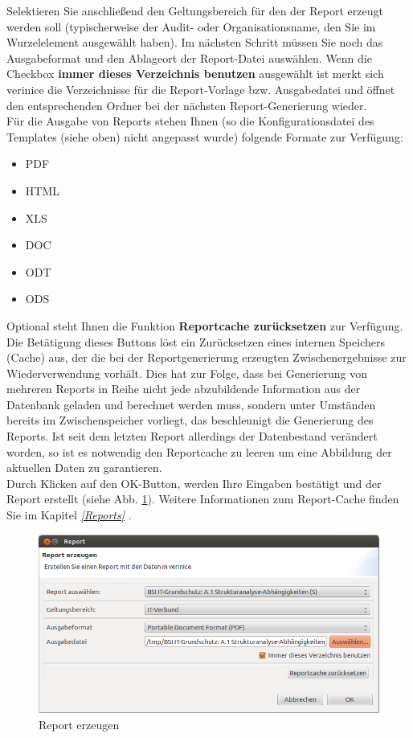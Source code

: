 \documentclass[a4paper,10pt]{book}
\begin{document}
Selektieren Sie anschließend den Geltungsbereich für den der Report erzeugt werden soll
(typischerweise der Audit- oder Organisationsname, den Sie im Wurzelelement ausgewählt haben). Im nächsten Schritt müssen Sie noch das Ausgabeformat
und den Ablageort der Report-Datei auswählen. Wenn die Checkbox \textbf{immer dieses Verzeichnis benutzen} ausgewählt ist merkt sich verinice die Verzeichnisse für die Report-Vorlage bzw. Ausgabedatei und öffnet den entsprechenden Ordner bei der nächsten Report-Generierung wieder.
\newline\\
Für die Ausgabe von Reports stehen Ihnen (so die Konfigurationsdatei des Templates (siehe oben) nicht angepasst wurde) folgende Formate zur Verfügung:
\begin{itemize}
 \item \textsc{PDF}
 \item \textsc{HTML}
 \item \textsc{XLS}
 \item \textsc{DOC}
 \item \textsc{ODT}
 \item \textsc{ODS}
\end{itemize}
Optional steht Ihnen die Funktion \textbf{Reportcache zurücksetzen} zur
Verfügung. Die Betätigung dieses Buttons löst ein Zurücksetzen eines
internen Speichers (Cache) aus,
der die bei der Reportgenerierung erzeugten Zwischenergebnisse zur
Wiederverwendung vorhält. Dies hat zur Folge, dass bei Generierung von
mehreren Reports in Reihe nicht jede abzubildende Information aus der Datenbank geladen und berechnet werden muss, sondern unter Umständen bereits im
Zwischenspeicher vorliegt, das beschleunigt die Generierung des Reports. Ist seit
dem letzten Report allerdings der Datenbestand verändert worden, so ist
es notwendig den Reportcache zu leeren um eine Abbildung der aktuellen
Daten zu garantieren.
\newline\\
Durch Klicken auf den OK-Button, werden Ihre Eingaben bestätigt und der Report erstellt (siehe Abb. \ref{Report erzeugen}).
\newline
Weitere Informationen zum Report-Cache finden Sie im Kapitel {\em \ref{Reports} }.
\begin{figure}[htb!]
  \centering
  \includegraphics[scale=.45]{Screenshot/Reportdialog.png}
  \caption{\label{Report erzeugen} Report erzeugen}
\end{figure}
\end{document}

